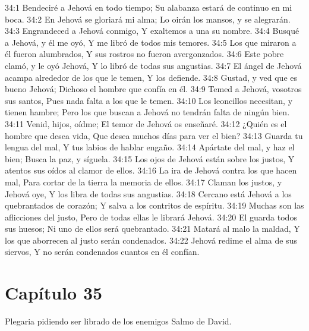 34:1 Bendeciré a Jehová en todo tiempo; 
Su alabanza estará de continuo en mi boca. 
34:2 En Jehová se gloriará mi alma; 
Lo oirán los mansos, y se alegrarán. 
34:3 Engrandeced a Jehová conmigo, 
Y exaltemos a una su nombre. 
34:4 Busqué a Jehová, y él me oyó, 
Y me libró de todos mis temores. 
34:5 Los que miraron a él fueron alumbrados, 
Y sus rostros no fueron avergonzados. 
34:6 Este pobre clamó, y le oyó Jehová, 
Y lo libró de todas sus angustias. 
34:7 El ángel de Jehová acampa alrededor de los que le temen, 
Y los defiende. 
34:8 Gustad, y ved que es bueno Jehová; 
Dichoso el hombre que confía en él. 
34:9 Temed a Jehová, vosotros sus santos, 
Pues nada falta a los que le temen. 
34:10 Los leoncillos necesitan, y tienen hambre; 
Pero los que buscan a Jehová no tendrán falta de ningún bien. 
34:11 Venid, hijos, oídme; 
El temor de Jehová os enseñaré. 
34:12 ¿Quién es el hombre que desea vida, 
Que desea muchos días para ver el bien? 
34:13 Guarda tu lengua del mal, 
Y tus labios de hablar engaño. 
34:14 Apártate del mal, y haz el bien; 
Busca la paz, y síguela. 
34:15 Los ojos de Jehová están sobre los justos, 
Y atentos sus oídos al clamor de ellos. 
34:16 La ira de Jehová contra los que hacen mal, 
Para cortar de la tierra la memoria de ellos. 
34:17 Claman los justos, y Jehová oye, 
Y los libra de todas sus angustias. 
34:18 Cercano está Jehová a los quebrantados de corazón; 
Y salva a los contritos de espíritu. 
34:19 Muchas son las aflicciones del justo, 
Pero de todas ellas le librará Jehová. 
34:20 El guarda todos sus huesos; 
Ni uno de ellos será quebrantado. 
34:21 Matará al malo la maldad, 
Y los que aborrecen al justo serán condenados. 
34:22 Jehová redime el alma de sus siervos, 
Y no serán condenados cuantos en él confían. 
\section*{Capítulo 35}
Plegaria pidiendo ser librado de los enemigos 
Salmo de David. 
 
